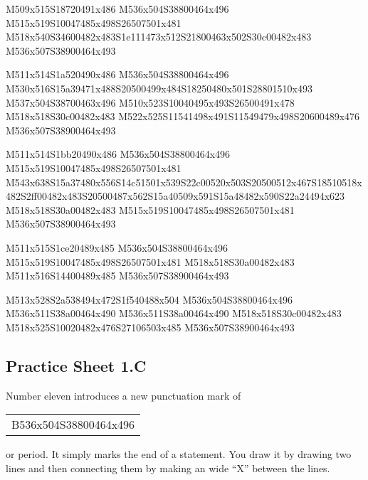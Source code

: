 \documentclass{article}
\begin{document}
\begin{multicols}{5}
\begin{center}

M509x515S18720491x486 %
M536x504S38800464x496 %
M515x519S10047485x498S26507501x481 %
M518x540S34600482x483S1e111473x512S21800463x502S30c00482x483 %
M536x507S38900464x493 %
\vfil
\columnbreak

M511x514S1a520490x486 %
M536x504S38800464x496 %
M530x516S15a39471x488S20500499x484S18250480x501S28801510x493 %
M537x504S38700463x496 %
M510x523S10040495x493S26500491x478 %
M518x518S30c00482x483 %
M522x525S11541498x491S11549479x498S20600489x476 %
M536x507S38900464x493 %
\vfil
\columnbreak

M511x514S1bb20490x486 %
M536x504S38800464x496 %
M515x519S10047485x498S26507501x481 %
M543x638S15a37480x556S14c51501x539S22c00520x503S20500512x467S18510518x482S2ff00482x483S20500487x562S15a40509x591S15a48482x590S22a24494x623 %
M518x518S30a00482x483 %
M515x519S10047485x498S26507501x481 %
M536x507S38900464x493 %
\vfil
\columnbreak

M511x515S1ce20489x485 %
M536x504S38800464x496 %
M515x519S10047485x498S26507501x481 %
M518x518S30a00482x483 %
M511x516S14400489x485 %
M536x507S38900464x493 %
\vfil
\columnbreak

M513x528S2a538494x472S1f540488x504 %
M536x504S38800464x496 %
M536x511S38a00464x490 %
M536x511S38a00464x490 %
M518x518S30c00482x483 %
M518x525S10020482x476S27106503x485 %
M536x507S38900464x493 %
\vfil

\end{center}
\end{multicols}

\subsection{Practice Sheet 1.C}

Number eleven introduces a new punctuation mark of \begin{tabular}{c}B536x504S38800464x496\end{tabular} or period.
It simply marks the end of a statement.
You draw it by drawing two lines and then connecting them by making an wide ``X'' between the lines.
\end{document}
